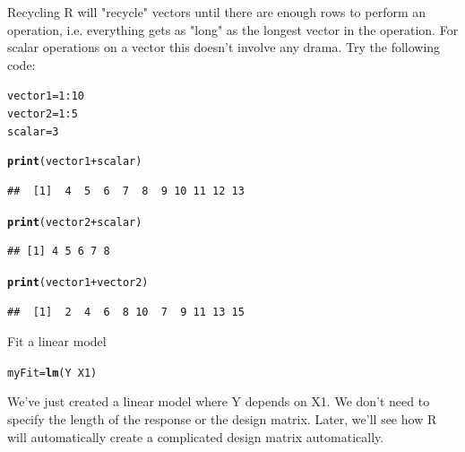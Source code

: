 \documentclass[xcolor=dvipsnames]{beamer}
\makeatletter
\newcommand{\hlnum}[1]{\textcolor[rgb]{0.686,0.059,0.569}{#1}}%
\newcommand{\hlopt}[1]{\textcolor[rgb]{0,0,0}{#1}}%
\newcommand{\hlstd}[1]{\textcolor[rgb]{0.345,0.345,0.345}{#1}}%
\newcommand{\hlkwb}[1]{\textcolor[rgb]{0.69,0.353,0.396}{#1}}%
\newcommand{\hlkwd}[1]{\textcolor[rgb]{0.737,0.353,0.396}{\textbf{#1}}}%
\newenvironment{kframe}{%
 \def\at@end@of@kframe{}%
 \ifinner\ifhmode%
  \def\at@end@of@kframe{\end{minipage}}%
  \begin{minipage}{\columnwidth}%
 \fi\fi%
 \def\FrameCommand##1{\hskip\@totalleftmargin \hskip-\fboxsep
 \colorbox{shadecolor}{##1}\hskip-\fboxsep
     \hskip-\linewidth \hskip-\@totalleftmargin \hskip\columnwidth}%
 \MakeFramed {\advance\hsize-\width
   \@totalleftmargin\z@ \linewidth\hsize
   \@setminipage}}%
 {\par\unskip\endMakeFramed%
 \at@end@of@kframe}
\newenvironment{knitrout}{}{} %
\makeatother
\begin{document}
\begin{frame}[fragile]{Recycling}
  R will "recycle" vectors until there are enough rows to perform an operation, i.e. everything gets as "long" as the longest vector in the operation. For scalar operations on a vector this doesn't involve any drama. Try the following code:
\begin{knitrout}\tiny
{}\color{fgcolor}\begin{kframe}
\begin{alltt}
\hlstd{vector1} \hlkwb{=} \hlnum{1}\hlopt{:}\hlnum{10}
\hlstd{vector2} \hlkwb{=} \hlnum{1}\hlopt{:}\hlnum{5}
\hlstd{scalar} \hlkwb{=} \hlnum{3}

\hlkwd{print}\hlstd{(vector1} \hlopt{+} \hlstd{scalar)}
\end{alltt}
\begin{verbatim}
##  [1]  4  5  6  7  8  9 10 11 12 13
\end{verbatim}
\begin{alltt}
\hlkwd{print}\hlstd{(vector2} \hlopt{+} \hlstd{scalar)}
\end{alltt}
\begin{verbatim}
## [1] 4 5 6 7 8
\end{verbatim}
\begin{alltt}
\hlkwd{print}\hlstd{(vector1} \hlopt{+} \hlstd{vector2)}
\end{alltt}
\begin{verbatim}
##  [1]  2  4  6  8 10  7  9 11 13 15
\end{verbatim}
\end{kframe}
\end{knitrout}

\end{frame}

\begin{frame}[fragile]{Fit a linear model}
\begin{knitrout}
\color{fgcolor}\begin{kframe}
\begin{alltt}
\hlstd{myFit} \hlkwb{=} \hlkwd{lm}\hlstd{(Y} \hlopt{~} \hlstd{X1)}
\end{alltt}
\end{kframe}
\end{knitrout}

We've just created a linear model where Y depends on X1. We don't need to specify the length of the response or the design matrix. Later, we'll see how R will automatically create a complicated design matrix automatically.
\end{frame}
\end{document}
